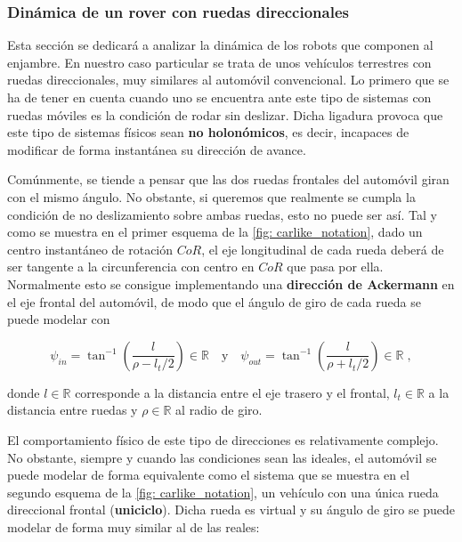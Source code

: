 
\vspace{-0.05cm}
\subsubsection{Dinámica de un rover con ruedas direccionales} \label{subsubsec: rover_dyn}

Esta sección se dedicará a analizar la dinámica de los robots que componen al enjambre. En nuestro caso particular se trata de unos vehículos terrestres con ruedas direccionales, muy similares al automóvil convencional. Lo primero que se ha de tener en cuenta cuando uno se encuentra ante este tipo de sistemas con ruedas móviles es la condición de rodar sin deslizar. Dicha ligadura provoca que este tipo de sistemas físicos sean \textbf{no holonómicos}, es decir, incapaces de modificar de forma instantánea su dirección de avance.

Comúnmente, se tiende a pensar que las dos ruedas frontales del automóvil giran con el mismo ángulo. No obstante, si queremos que realmente se cumpla la condición de no deslizamiento sobre ambas ruedas, esto no puede ser así. Tal y como se muestra en el primer esquema de la \autoref{fig: carlike_notation}, dado un centro instantáneo de rotación $CoR$, el eje longitudinal de cada rueda deberá de ser tangente a la circunferencia con centro en $CoR$ que pasa por ella. Normalmente esto se consigue implementando una \textbf{dirección de Ackermann} en el eje frontal del automóvil, de modo que el ángulo de giro de cada rueda se puede modelar con

\begin{equation} \label{eq: Ackermann}
    \psi_{in} = \tan^{-1}\left(\frac{l}{\rho - l_t/2}\right) \in \mathds{R} \quad \text{y} \quad \psi_{out} = \tan^{-1}\left(\frac{l}{\rho + l_t/2}\right) \in \mathds{R}\; ,
\end{equation}

donde $l \in \mathds{R}$ corresponde a la distancia entre el eje trasero y el frontal, $l_t \in \mathds{R}$ a la distancia entre ruedas y $\rho \in \mathds{R}$ al radio de giro.

El comportamiento físico de este tipo de direcciones es relativamente complejo. No obstante, siempre y cuando las condiciones sean las ideales, el automóvil se puede modelar de forma equivalente como el sistema que se muestra en el segundo esquema de la \autoref{fig: carlike_notation}, un vehículo con una única rueda direccional frontal (\textbf{uniciclo}). Dicha rueda es virtual y su ángulo de giro se puede modelar de forma muy similar al de las reales:

